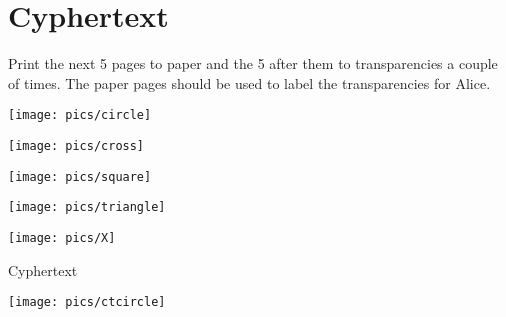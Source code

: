 \documentclass[a4paper,10pt]{article}
\begin{document}
\newpage

\section{Cyphertext}

Print the next 5 pages to paper and the 5 after them to transparencies a couple of times. The paper pages should be used to label the transparencies for Alice.



\newpage
\label{pg_circle}

\phantom{a}
\begin{center}
\vspace{4cm}
\texttt{[image: pics/circle]}
\end{center}

\newpage
\label{pg_cross}

\phantom{a}
\begin{center}
\vspace{4cm}
\texttt{[image: pics/cross]}
\end{center}

\newpage
\label{pg_square}

\phantom{a}
\begin{center}
\vspace{4cm}
\texttt{[image: pics/square]}
\end{center}

\newpage
\label{pg_triangle}


\phantom{a}
\begin{center}
\vspace{4cm}
\texttt{[image: pics/triangle]}
\end{center}


\newpage
\label{pg_X}
\label{pg_last_paper_printed}

\phantom{a}
\begin{center}
\vspace{4cm}
\texttt{[image: pics/X]}
\end{center}



\newpage
\thispagestyle{empty}


\phantom{a}
\begin{center}
{\Huge Cyphertext}

\vspace{4cm}
\texttt{[image: pics/ctcircle]}
\end{center}

\newpage
\thispagestyle{empty}
\end{document}
